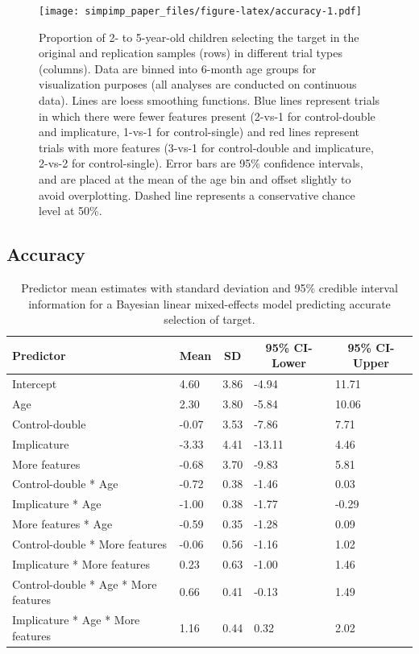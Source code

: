 \documentclass[man]{apa6}
\theoremstyle{definition}
\theoremstyle{definition}
\theoremstyle{definition}
\theoremstyle{remark}
\begin{document}
\begin{figure}
\centering
\texttt{[image: simpimp\_paper\_files/figure-latex/accuracy-1.pdf]}
\caption{\label{fig:accuracy}Proportion of 2- to 5-year-old children
selecting the target in the original and replication samples (rows) in
different trial types (columns). Data are binned into 6-month age groups
for visualization purposes (all analyses are conducted on continuous
data). Lines are loess smoothing functions. Blue lines represent trials
in which there were fewer features present (2-vs-1 for control-double
and implicature, 1-vs-1 for control-single) and red lines represent
trials with more features (3-vs-1 for control-double and implicature,
2-vs-2 for control-single). Error bars are 95\% confidence intervals,
and are placed at the mean of the age bin and offset slightly to avoid
overplotting. Dashed line represents a conservative chance level at
50\%.}
\end{figure}

\subsection{Accuracy}\label{accuracy}

\begin{table}[tbp]
\begin{center}
\begin{threeparttable}
\caption{\label{tab:brmacc}Predictor mean estimates with standard deviation and 95\% credible interval information for a Bayesian linear mixed-effects model predicting accurate selection of target.}
\begin{tabular}{lllll}
\toprule
Predictor & \multicolumn{1}{c}{Mean} & \multicolumn{1}{c}{SD} & \multicolumn{1}{c}{95\% CI-Lower} & \multicolumn{1}{c}{95\% CI-Upper}\\
\midrule
Intercept & 4.60 & 3.86 & -4.94 & 11.71\\
Age & 2.30 & 3.80 & -5.84 & 10.06\\
Control-double & -0.07 & 3.53 & -7.86 & 7.71\\
Implicature & -3.33 & 4.41 & -13.11 & 4.46\\
More features & -0.68 & 3.70 & -9.83 & 5.81\\
Control-double * Age & -0.72 & 0.38 & -1.46 & 0.03\\
Implicature * Age & -1.00 & 0.38 & -1.77 & -0.29\\
More features * Age & -0.59 & 0.35 & -1.28 & 0.09\\
Control-double * More features & -0.06 & 0.56 & -1.16 & 1.02\\
Implicature * More features & 0.23 & 0.63 & -1.00 & 1.46\\
Control-double * Age * More features & 0.66 & 0.41 & -0.13 & 1.49\\
Implicature * Age * More features & 1.16 & 0.44 & 0.32 & 2.02\\
\bottomrule
\end{tabular}
\end{threeparttable}
\end{center}
\end{table}
\end{document}
